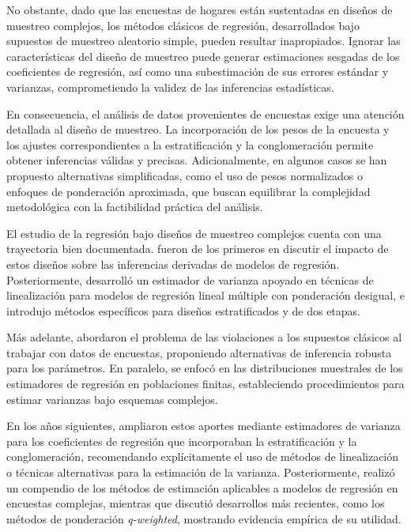 \documentclass[
  spanish,
  12pt,
]{book}
\begin{document}
No obstante, dado que las encuestas de hogares están sustentadas en diseños de muestreo complejos, los métodos clásicos de regresión, desarrollados bajo supuestos de muestreo aleatorio simple, pueden resultar inapropiados. Ignorar las características del diseño de muestreo puede generar estimaciones sesgadas de los coeficientes de regresión, así como una subestimación de sus errores estándar y varianzas, comprometiendo la validez de las inferencias estadísticas.

En consecuencia, el análisis de datos provenientes de encuestas exige una atención detallada al diseño de muestreo. La incorporación de los pesos de la encuesta y los ajustes correspondientes a la estratificación y la conglomeración permite obtener inferencias válidas y precisas. Adicionalmente, en algunos casos se han propuesto alternativas simplificadas, como el uso de pesos normalizados o enfoques de ponderación aproximada, que buscan equilibrar la complejidad metodológica con la factibilidad práctica del análisis.

El estudio de la regresión bajo diseños de muestreo complejos cuenta con una trayectoria bien documentada. \citet{kish1974inference} fueron de los primeros en discutir el impacto de estos diseños sobre las inferencias derivadas de modelos de regresión. Posteriormente, \citet{fuller1975regression} desarrolló un estimador de varianza apoyado en técnicas de linealización para modelos de regresión lineal múltiple con ponderación desigual, e introdujo métodos específicos para diseños estratificados y de dos etapas.

Más adelante, \citet{shah1977inference} abordaron el problema de las violaciones a los supuestos clásicos al trabajar con datos de encuestas, proponiendo alternativas de inferencia robusta para los parámetros. En paralelo, \citet{binder1983variances} se enfocó en las distribuciones muestrales de los estimadores de regresión en poblaciones finitas, estableciendo procedimientos para estimar varianzas bajo esquemas complejos.

En los años siguientes, \citet{skinner1989analysis} ampliaron estos aportes mediante estimadores de varianza para los coeficientes de regresión que incorporaban la estratificación y la conglomeración, recomendando explícitamente el uso de métodos de linealización o técnicas alternativas para la estimación de la varianza. Posteriormente, \citet{fuller2002regression} realizó un compendio de los métodos de estimación aplicables a modelos de regresión en encuestas complejas, mientras que \citet{pfeffermann2011modelling} discutió desarrollos más recientes, como los métodos de ponderación \emph{q-weighted}, mostrando evidencia empírica de su utilidad.
\end{document}
